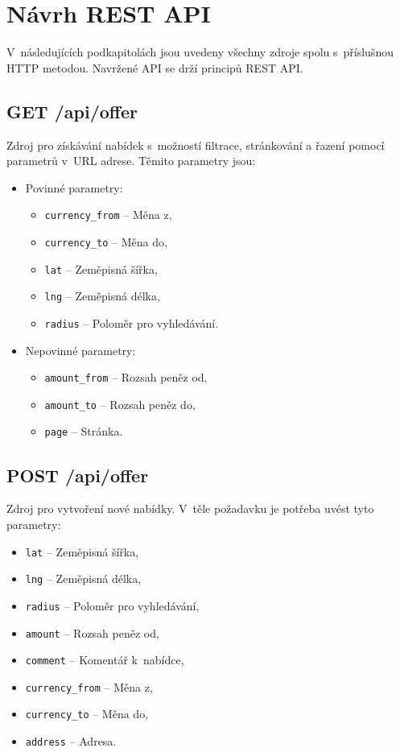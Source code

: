 \pagebreak
\section{Návrh REST API}\label{rest-api-design}
V~následujících podkapitolách jsou uvedeny všechny zdroje spolu s~příslušnou HTTP metodou. Navržené API se drží principů REST API.

\subsection{GET /api/offer}
Zdroj pro získávání nabídek s~možností filtrace, stránkování a řazení pomocí parametrů v~URL adrese. Těmito parametry jsou:
\begin{itemize}
    \item Povinné parametry:
    \begin{itemize}
        \item \texttt{currency\_from} -- Měna z,
        \item \texttt{currency\_to} -- Měna do,
        \item \texttt{lat} -- Zeměpisná šířka,
        \item \texttt{lng} -- Zeměpisná délka,
        \item \texttt{radius} -- Poloměr pro vyhledávání.
    \end{itemize}
    \item Nepovinné parametry:
    \begin{itemize}
        \item \texttt{amount\_from} -- Rozsah peněz od,
        \item \texttt{amount\_to} -- Rozsah peněz do,
        \item \texttt{page} -- Stránka.
    \end{itemize}
\end{itemize}

\subsection{POST /api/offer}
Zdroj pro vytvoření nové nabídky. V~těle požadavku je potřeba uvést tyto parametry:
\begin{itemize}
    \item \texttt{lat} -- Zeměpisná šířka,
    \item \texttt{lng} -- Zeměpisná délka,
    \item \texttt{radius} -- Poloměr pro vyhledávání,
    \item \texttt{amount} -- Rozsah peněz od,
    \item \texttt{comment} -- Komentář k~nabídce,
    \item \texttt{currency\_from} -- Měna z,
    \item \texttt{currency\_to} -- Měna do,
    \item \texttt{address} -- Adresa.
\end{itemize}

